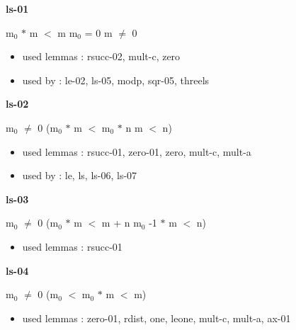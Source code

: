 \documentclass[a4paper]{article}
\begin{document}
\medskip

\bigskip

{\large\bf ls-01}

\medskip

 \Fol $\mbox{m}_{0}$ $*$ m $<$ m \Equiv $\mbox{m}_{0}$ = 0 \And m $\neq$ 0

\begin{itemize}


\item       used lemmas  : rsucc-02, mult-c, zero
\item       used by      : le-02, ls-05, modp, sqr-05, threels

\end{itemize}

\medskip

\bigskip

{\large\bf ls-02}

\medskip

 \Fol $\mbox{m}_{0}$ $\neq$ 0 \Imp ($\mbox{m}_{0}$ $*$ m $<$ $\mbox{m}_{0}$ $*$ n \Equiv m $<$ n)

\begin{itemize}


\item       used lemmas  : rsucc-01, zero-01, zero, mult-c, mult-a
\item       used by      : le, ls, ls-06, ls-07

\end{itemize}

\medskip

\bigskip

{\large\bf ls-03}

\medskip

 \Fol $\mbox{m}_{0}$ $\neq$ 0 \Imp ($\mbox{m}_{0}$ $*$ m $<$ m + n \Equiv $\mbox{m}_{0}$ -1 $*$ m $<$ n)

\begin{itemize}


\item       used lemmas  : rsucc-01

\end{itemize}

\medskip

\bigskip

{\large\bf ls-04}

\medskip

 \Fol $\mbox{m}_{0}$ $\neq$ 0 \Imp ($\mbox{m}_{0}$ $<$ $\mbox{m}_{0}$ $*$ m  $<$ m)

\begin{itemize}


\item       used lemmas  : zero-01, rdist, one, leone, mult-c, mult-a, ax-01

\end{itemize}
\end{document}
